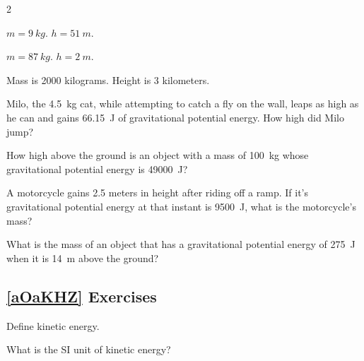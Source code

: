 \documentclass{article}
\numberwithin{equation}{section}
\numberwithin{figure}{section}
\begin{document}
\begin{multicols}{2}
\begin{exercise} \label{29XPZj}
    $m = \SI{9}{kg}$. $h = \SI{51}{m}$.
\end{exercise}

\begin{exercise} \label{Fv0opf}
    $m = \SI{87}{kg}$. $h = \SI{2}{m}$.
\end{exercise}

\begin{exercise} \label{Y0v7pI}
    Mass is 2000 kilograms. Height is 3 kilometers.
\end{exercise}

\cyanhrule
\end{multicols}

\begin{exercise} \label{CdBjWD}
    Milo, the \SI{4.5}{kg} cat, while attempting to catch a fly on the wall, leaps as high as he can and gains \SI{66.15}{J} of gravitational potential energy. How high did Milo jump?
\end{exercise}

\begin{exercise} \label{M8oc7x}
    How high above the ground is an object with a mass of \SI{100}{kg} whose gravitational potential energy is \SI{49000}{J}?
\end{exercise}

\begin{exercise} \label{4S3f3k}
    A motorcycle gains 2.5 meters in height after riding off a ramp. If it's gravitational potential energy at that instant is \SI{9500}{J}, what is the motorcycle's mass?
\end{exercise}

\begin{exercise} \label{JangCo}
    What is the mass of an object that has a gravitational potential energy of \SI{275}{J} when it is \SI{14}{m} above the ground?
\end{exercise}



\clearpage

\subsection*{\ref{aOaKHZ} Exercises}

\begin{exercise} \label{jnYiIT}
    Define kinetic energy.
\end{exercise}

\begin{exercise}
    What is the SI unit of kinetic energy?
\end{exercise}
\end{document}
